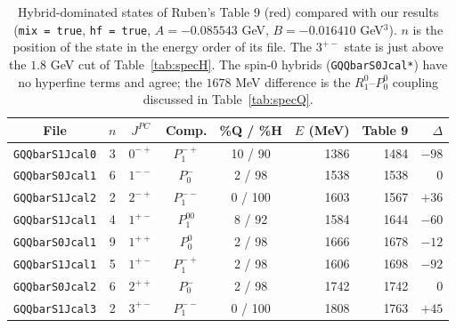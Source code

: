 \documentclass[11pt, a4paper]{article}
\begin{document}
\begin{table}[hbt!]
    \small
    \begin{tabular}{c c c c c r r r}
        \toprule
        File & $n$ & $J^{PC}$ & Comp. & \%Q / \%H & $E$ (MeV) & Table 9 & $\Delta$ \\
        \midrule
        \texttt{GQQbarS1Jcal0} & 3 & $0^{-+}$ & $P_1^{-+}$ & 10 / 90 & 1386 & 1484 & $-98$ \\
        \texttt{GQQbarS0Jcal1} & 6 & $1^{--}$ & $P_0^{-}$ & 2 / 98 & 1538 & 1538 & $0$ \\
        \texttt{GQQbarS1Jcal2} & 2 & $2^{-+}$ & $P_1^{--}$ & 0 / 100 & 1603 & 1567 & $+36$ \\
        \texttt{GQQbarS1Jcal1} & 4 & $1^{+-}$ & $P_1^{00}$ & 8 / 92 & 1584 & 1644 & $-60$ \\
        \texttt{GQQbarS0Jcal1} & 9 & $1^{++}$ & $P_0^{0}$ & 2 / 98 & 1666 & 1678 & $-12$ \\
        \texttt{GQQbarS1Jcal1} & 5 & $1^{+-}$ & $P_1^{-+}$ & 2 / 98 & 1606 & 1698 & $-92$ \\
        \texttt{GQQbarS0Jcal2} & 6 & $2^{++}$ & $P_0^{-}$ & 2 / 98 & 1742 & 1742 & $0$ \\
        \texttt{GQQbarS1Jcal3} & 2 & $3^{+-}$ & $P_1^{--}$ & 0 / 100 & 1808 & 1763 & $+45$ \\
        \bottomrule
    \end{tabular}
    \caption{\small Hybrid-dominated states of Ruben's Table 9 (red) compared with our results (\texttt{mix = true}, \texttt{hf = true}, $A=-0.085543$ GeV, $B=-0.016410$ GeV$^3$). $n$ is the position of the state in the energy order of its file. The $3^{+-}$ state is just above the $1.8$ GeV cut of Table~\ref{tab:specH}. The spin-0 hybrids (\texttt{GQQbarS0Jcal*}) have no hyperfine terms and agree; the $1678$ MeV difference is the $R_1^0$--$P_0^0$ coupling discussed in Table~\ref{tab:specQ}.}
    \label{tab:table9}
\end{table}
\end{document}
